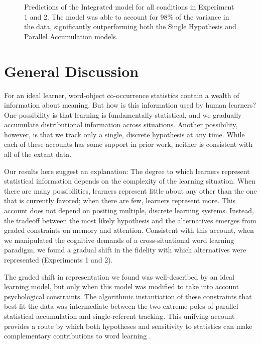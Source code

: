 \documentclass{pnastwo}
\begin{document}
\begin{article}
 \begin{figure}[!tb]
	\caption{\label{fig:model_fit} Predictions of the Integrated model for all conditions in Experiment 1 and 2. The model was able to account for 98\% of the variance in the data, significantly outperforming both the Single Hypothesis and Parallel Accumulation models.}
\end{figure}

\section{General Discussion}

For an ideal learner, word-object co-occurrence statistics contain a wealth of information about meaning. But how is this information used by human learners? One possibility is that learning is fundamentally statistical, and we gradually accumulate distributional information across situations. Another possibility, however, is that we track only a single, discrete hypothesis at any time. While each of these accounts has some support in prior work, neither is consistent with all of the extant data.

Our results here suggest an explanation: The degree to which learners represent statistical information depends on the complexity of the learning situation. When there are many possibilities, learners represent little about any other than the one that is currently favored; when there are few, learners represent more. This account does not depend on positing multiple, discrete learning systems. Instead, the tradeoff between the most likely hypothesis and the alternatives emerges from graded constraints on memory and attention. Consistent with this account, when we manipulated the cognitive demands of a cross-situational word learning paradigm, we found a gradual shift in the fidelity with which alternatives were represented (Experiments 1 and 2).

The graded shift in representation we found was well-described by an ideal learning model, but only when this model was modified to take into account psychological constraints. The algorithmic instantiation of these constraints that best fit the data was intermediate between the two extreme poles of parallel statistical accumulation and single-referent tracking. This unifying account provides a route by which both hypotheses and sensitivity to statistics can make complementary contributions to word learning \cite{Waxman2009,Kachergis2013}. 


\end{article}
\end{document}
